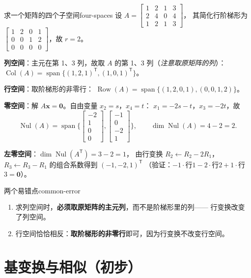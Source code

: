 \documentclass[11pt,a4paper,openany]{ctexbook}
\DeclareMathOperator{\Span}{span}
\DeclareMathOperator{\Col}{Col}
\DeclareMathOperator{\Nul}{Nul}
\DeclareMathOperator{\Row}{Row}
\begin{document}
\begin{exmp}{求一个矩阵的四个子空间}{four-spaces}
设
$A=\begin{bmatrix}1&2&1&3\\ 2&4&0&4\\ 1&2&1&3\end{bmatrix}$，
其简化行阶梯形为
$\begin{bmatrix}1&2&0&1\\ 0&0&1&2\\ 0&0&0&0\end{bmatrix}$，故 $r=2$。

\smallskip
\textbf{列空间}：主元在第 1、3 列，故取 $A$ 的第 1、3 列（\emph{注意取原矩阵的列}）：
$\Col(A)=\Span\{(1,2,1)^{\mathsf T},(1,0,1)^{\mathsf T}\}$。

\smallskip
\textbf{行空间}：取阶梯形的非零行：
$\Row(A)=\Span\{(1,2,0,1),(0,0,1,2)\}$。

\smallskip
\textbf{零空间}：解 $A\boldsymbol{x}=\boldsymbol{0}$。自由变量 $x_2=s$，$x_4=t$：
$x_1=-2s-t$，$x_3=-2t$，故
\[
\Nul(A)=\Span\Big\{\begin{bmatrix}-2\\1\\0\\0\end{bmatrix},
                    \begin{bmatrix}-1\\0\\-2\\1\end{bmatrix}\Big\},
\qquad \dim\Nul(A)=4-2=2.
\]

\smallskip
\textbf{左零空间}：$\dim\Nul(A^{\mathsf T})=3-2=1$，
由行变换 $R_2\leftarrow R_2-2R_1$，$R_3\leftarrow R_3-R_1$ 的组合系数得到
$(-1,-2,1)^{\mathsf T}$
（验证：$-1\cdot$行$1-2\cdot$行$2+1\cdot$行$3=\boldsymbol{0}$）。
\end{exmp}

\begin{remk}{两个易错点}{common-error}
\begin{enumerate}[label=(\alph*)]
\item 求列空间时，\textbf{必须取原矩阵的主元列}，而不是阶梯形里的列——
      行变换改变了列空间。
\item 行空间恰恰相反：\textbf{取阶梯形的非零行}即可，因为行变换不改变行空间。
\end{enumerate}
\end{remk}

\section{基变换与相似（初步）}
\end{document}
